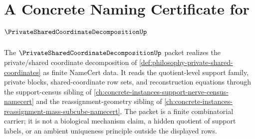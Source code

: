 \chapter{A Concrete Naming Certificate for $\PrivateSharedCoordinateDecompositionUp$}
\label{ch:concrete-instances-private-shared-coordinate-decomposition-namecert}

The $\PrivateSharedCoordinateDecompositionUp$ packet realizes the private/shared coordinate decomposition of \autoref{def:philosophy-private-shared-coordinates} as finite NameCert data. It reads the quotient-level support family, private blocks, shared-coordinate row sets, and reconstruction equations through the support-census sibling of \autoref{ch:concrete-instances-support-nerve-census-namecert} and the reassignment-geometry sibling of \autoref{ch:concrete-instances-reassignment-mass-subcube-namecert}. The packet is a finite combinatorial carrier; it is not a biological mechanism claim, a hidden quotient of support labels, or an ambient uniqueness principle outside the displayed rows.

